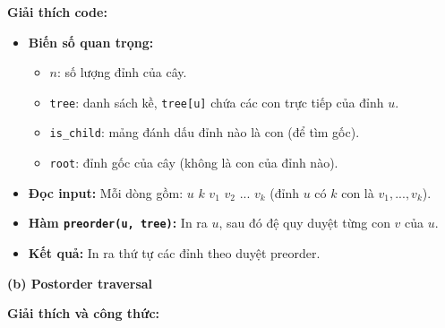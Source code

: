 \documentclass{article}
\begin{document}
\textbf{Giải thích code:}

\begin{itemize}
    \item \textbf{Biến số quan trọng:}
    \begin{itemize}
        \item $n$: số lượng đỉnh của cây.
        \item \texttt{tree}: danh sách kề, \texttt{tree[u]} chứa các con trực tiếp của đỉnh $u$.
        \item \texttt{is\_child}: mảng đánh dấu đỉnh nào là con (để tìm gốc).
        \item \texttt{root}: đỉnh gốc của cây (không là con của đỉnh nào).
    \end{itemize}
    \item \textbf{Đọc input:} Mỗi dòng gồm: $u$ $k$ $v_1$ $v_2$ ... $v_k$ (đỉnh $u$ có $k$ con là $v_1, ..., v_k$).
    \item \textbf{Hàm \texttt{preorder(u, tree)}:} In ra $u$, sau đó đệ quy duyệt từng con $v$ của $u$.
    \item \textbf{Kết quả:} In ra thứ tự các đỉnh theo duyệt preorder.
\end{itemize}



\textbf{(b) Postorder traversal}

\textbf{Giải thích và công thức:}
\end{document}
